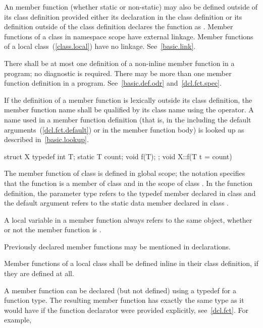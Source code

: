 \pnum
An  member function (whether static or non-static) may
also be defined outside of its class definition provided either its
declaration in the class definition or its definition outside of the
class definition declares the function as .
\enternote
Member functions of a class in namespace scope have external linkage.
Member functions of a local class~(\ref{class.local}) have no linkage.
See~\ref{basic.link}.
\exitnote

\pnum
There shall be at most one definition of a non-inline member function in
a program; no diagnostic is required. There may be more than one
 member function definition in a program.
See~\ref{basic.def.odr} and~\ref{dcl.fct.spec}.

\pnum
{}%
If the definition of a member function is lexically outside its class
definition, the member function name shall be qualified by its class
name using the \tcode{::} operator.
\enternote
A name used in a member function definition (that is, in the
 including the default
arguments~(\ref{dcl.fct.default}) or in the member function body) is looked up
as described in~\ref{basic.lookup}.
\exitnote
\enterexample

\begin{codeblock}
struct X {
  typedef int T;
  static T count;
  void f(T);
};
void X::f(T t = count) { }
\end{codeblock}

The member function  of class  is defined in global
scope; the notation  specifies that the function 
is a member of class  and in the scope of class . In
the function definition, the parameter type  refers to the
typedef member  declared in class  and the default
argument  refers to the static data member 
declared in class .
\exitexample

\pnum
A  local variable in a member function always refers to
the same object, whether or not the member function is .

\pnum
Previously declared member functions may be mentioned in  declarations.

\pnum
{}%
Member functions of a local class shall be defined inline in their class
definition, if they are defined at all.

\pnum
\enternote
A member function can be declared (but not defined) using a typedef for
a function type. The resulting member function has exactly the same type
as it would have if the function declarator were provided explicitly,
see~\ref{dcl.fct}. For example,

